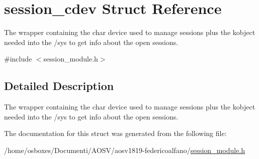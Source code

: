 \hypertarget{structsession__cdev}{}\section{session\+\_\+cdev Struct Reference}
\label{structsession__cdev}


The wrapper containing the char device used to manage sessions plus the kobject needed into the /sys to get info about the open sessions.  




{\ttfamily \#include $<$session\+\_\+module.\+h$>$}



\subsection{Detailed Description}
The wrapper containing the char device used to manage sessions plus the kobject needed into the /sys to get info about the open sessions. 

The documentation for this struct was generated from the following file\+:\begin{DoxyCompactItemize}
\item 
/home/osboxes/\+Documenti/\+A\+O\+S\+V/aosv1819-\/federicoalfano/\hyperlink{session__module_8h}{session\+\_\+module.\+h}\end{DoxyCompactItemize}
